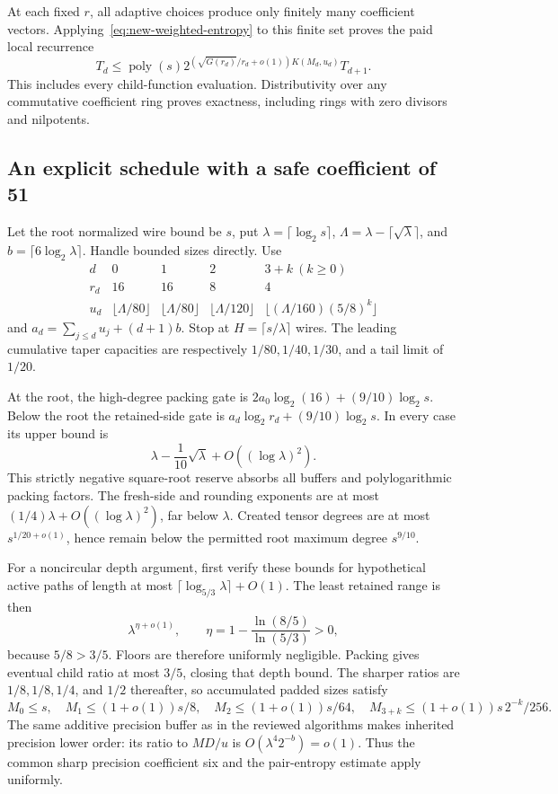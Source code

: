 At each fixed $r$, all adaptive choices produce only finitely many
coefficient vectors. Applying~\eqref{eq:new-weighted-entropy} to this finite
set proves the paid local recurrence
\begin{equation}\label{eq:new-streamed-recurrence}
 T_d\le\operatorname{poly}(s)
 2^{(\sqrt{G(r_d)}/r_d+o(1))K(M_d,u_d)}T_{d+1}.
\end{equation}
This includes every child-function evaluation. Distributivity over any
commutative coefficient ring proves exactness, including rings with zero
divisors and nilpotents.

\subsection{An explicit schedule with a safe coefficient of 51}
Let the root normalized wire bound be $s$, put
$\lambda=\lceil\log_2s\rceil$,
$\Lambda=\lambda-\lceil\sqrt\lambda\rceil$, and
$b=\lceil6\log_2\lambda\rceil$. Handle bounded sizes directly. Use
\[
 \begin{array}{c|cccc}
 d&0&1&2&3+k\ (k\ge0)\\\hline
 r_d&16&16&8&4\\
 u_d&\lfloor\Lambda/80\rfloor&\lfloor\Lambda/80\rfloor&
 \lfloor\Lambda/120\rfloor&
 \lfloor(\Lambda/160)(5/8)^k\rfloor
 \end{array}
\]
and $a_d=\sum_{j\le d}u_j+(d+1)b$. Stop at
$H=\lceil s/\lambda\rceil$ wires. The leading cumulative taper capacities
are respectively $1/80,1/40,1/30$, and a tail limit of $1/20$.

At the root, the high-degree packing gate is
$2a_0\log_2(16)+(9/10)\log_2s$.
Below the root the retained-side gate is
$a_d\log_2r_d+(9/10)\log_2s$.
In every case its upper bound is
\[
 \lambda-\frac1{10}\sqrt\lambda+O((\log\lambda)^2).
\]
This strictly negative square-root reserve absorbs all buffers and
polylogarithmic packing factors. The fresh-side and rounding exponents are
at most $(1/4)\lambda+O((\log\lambda)^2)$, far below $\lambda$.
Created tensor degrees are at most $s^{1/20+o(1)}$, hence remain below the
permitted root maximum degree $s^{9/10}$.

For a noncircular depth argument, first verify these bounds for hypothetical
active paths of length at most $\lceil\log_{5/3}\lambda\rceil+O(1)$.
The least retained range is then
\[
 \lambda^{\eta+o(1)},\qquad
 \eta=1-\frac{\ln(8/5)}{\ln(5/3)}>0,
\]
because $5/8>3/5$. Floors are therefore uniformly negligible. Packing gives
eventual child ratio at most $3/5$, closing that depth bound. The sharper
ratios are $1/8,1/8,1/4$, and $1/2$ thereafter, so accumulated padded sizes
satisfy
\[
 M_0\le s,\quad M_1\le(1+o(1))s/8,\quad
 M_2\le(1+o(1))s/64,\quad
 M_{3+k}\le(1+o(1))s\,2^{-k}/256.
\]
The same additive precision buffer as in the reviewed algorithms makes
inherited precision lower order: its ratio to $MD/u$ is
$O(\lambda^4 2^{-b})=o(1)$. Thus the common sharp precision coefficient six
and the pair-entropy estimate apply uniformly.

